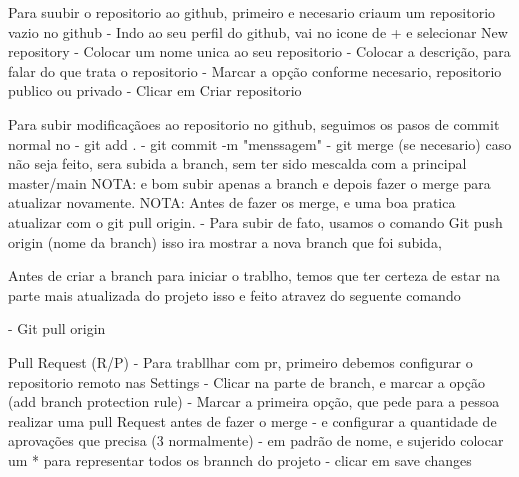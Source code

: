 Para suubir o repositorio ao github, primeiro e necesario criaum um repositorio vazio no github
 - Indo ao seu perfil do github, vai no icone de + e selecionar New repository
 - Colocar um nome unica ao seu repositorio
 - Colocar a descrição, para falar do que trata o repositorio
 - Marcar a opção conforme necesario, repositorio publico ou privado
 - Clicar em Criar repositorio

 
 Para subir modificaçãoes ao repositorio no github, seguimos os pasos de commit normal no
    - git add .
    - git commit -m "menssagem"
    - git merge (se necesario) caso não seja feito, sera subida a branch, sem ter sido mescalda com a principal master/main
    NOTA: e bom subir apenas a branch e depois fazer o merge para atualizar novamente.
    NOTA: Antes de fazer os merge, e uma boa pratica atualizar com o git pull origin.
    - Para subir de fato, usamos o comando Git push origin (nome da branch)
    isso ira mostrar a nova branch que foi subida,

Antes de criar a branch para iniciar o trablho, temos que ter certeza de estar na parte
mais atualizada do projeto isso e feito atravez do seguente comando

   - Git pull origin 

Pull Request (R/P)
   - Para trabllhar com pr, primeiro debemos configurar o repositorio remoto nas Settings 
   - Clicar na parte de branch, e marcar a opção (add branch protection rule)
   - Marcar a primeira opção, que pede para a pessoa realizar uma pull Request antes de fazer o merge
   - e configurar a quantidade de aprovações que precisa (3 normalmente)
   - em padrão de nome, e sujerido colocar um * para representar todos os brannch do projeto
   - clicar em save changes